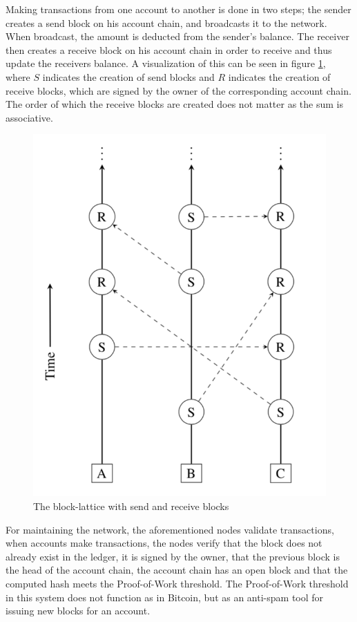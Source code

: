 Making transactions from one account to another is done in two steps; the sender creates a send block on his account chain, and broadcasts it to the network. When broadcast, the amount is deducted from the sender's balance. The receiver then creates a receive block on his account chain in order to receive and thus update the receivers balance. A visualization of this can be seen in figure \ref{fig:rai-block-lattice}, where $S$ indicates the creation of send blocks and $R$ indicates the creation of receive blocks, which are signed by the owner of the corresponding account chain. The order of which the receive blocks are created does not matter as the sum is associative.

\begin{figure}[H]
    \centering
    \includegraphics[scale=0.4]{images/RaiBlock_blocklattice.png}
    \caption{The block-lattice with send and receive blocks }
    \label{fig:rai-block-lattice}
\end{figure}

For maintaining the network, the aforementioned nodes validate transactions, when accounts make transactions, the nodes verify that the block does not already exist in the ledger, it is signed by the owner, that the previous block is the head of the account chain, the account chain has an open block and that the computed hash meets the Proof-of-Work threshold. The Proof-of-Work threshold in this system does not function as in Bitcoin, but as an anti-spam tool for issuing new blocks for an account.


